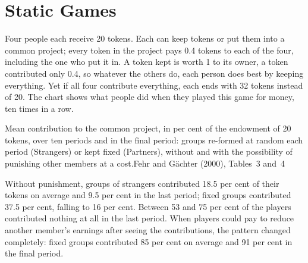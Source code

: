 \chapter{Static Games}\label{ch:b2:static-games}

Four people each receive 20 tokens. Each can keep tokens or put them into a common project; every token in
the project pays 0.4 tokens to each of the four, including the one who put it in. A token kept is worth 1
to its owner, a token contributed only 0.4, so whatever the others do, each person does best by keeping
everything. Yet if all four contribute everything, each ends with 32 tokens instead of 20. The chart shows
what people did when they played this game for money, ten times in a row.

\begin{openingchart}{Mean contribution to the common project, in per cent of the endowment of 20 tokens,
  over ten periods and in the final period: groups re-formed at random each period (Strangers) or kept
  fixed (Partners), without and with the possibility of punishing other members at a cost.}{Fehr and
  G\"achter (2000), Tables~3 and~4}
\end{openingchart}

Without punishment, groups of strangers contributed 18.5 per cent of their tokens on average and 9.5 per
cent in the last period; fixed groups contributed 37.5 per cent, falling to 16 per cent. Between 53 and 75
per cent of the players contributed nothing at all in the last period. When players could pay to reduce
another member's earnings after seeing the contributions, the pattern changed completely: fixed groups
contributed 85 per cent on average and 91 per cent in the final period.

